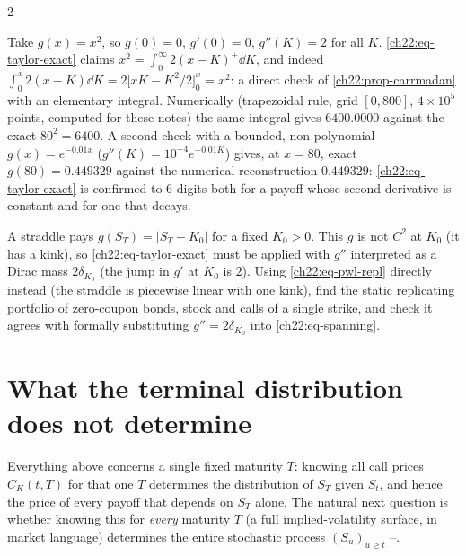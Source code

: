 \begin{paracol}{2}
\begin{example}[Checking the identity on $g(x)=x^2$]\label{ch22:ex-x2}
Take $g(x)=x^2$, so $g(0)=0$, $g'(0)=0$, $g''(K)=2$ for all $K$. \eqref{ch22:eq-taylor-exact} claims
$x^2=\int_0^\infty 2(x-K)^+\dd K$, and indeed $\int_0^x 2(x-K)\dd K=2\bigl[xK-K^2/2\bigr]_0^x=x^2$: a
direct check of \cref{ch22:prop-carrmadan} with an elementary integral. Numerically (trapezoidal rule,
grid $[0,800]$, $4\times10^5$ points, computed for these notes) the same integral gives $6400.0000$
against the exact $80^2=6400$. A second check with a bounded, non-polynomial $g(x)=e^{-0.01x}$
($g''(K)=10^{-4}e^{-0.01K}$) gives, at $x=80$, exact $g(80)=0.449329$ against the numerical
reconstruction $0.449329$: \eqref{ch22:eq-taylor-exact} is confirmed to $6$ digits both for a payoff
whose second derivative is constant and for one that decays.
\end{example}

\begin{exercise}\label{ch22:ex-straddle}
A straddle pays $g(S_T)=|S_T-K_0|$ for a fixed $K_0>0$. This $g$ is not $C^2$ at $K_0$ (it has a
kink), so \eqref{ch22:eq-taylor-exact} must be applied with $g''$ interpreted as a Dirac mass
$2\delta_{K_0}$ (the jump in $g'$ at $K_0$ is $2$). Using \eqref{ch22:eq-pwl-repl} directly instead
(the straddle is piecewise linear with one kink), find the static replicating portfolio of zero-coupon
bonds, stock and calls of a single strike, and check it agrees with formally substituting $g''=2\delta_{K_0}$
into \eqref{ch22:eq-spanning}.
\end{exercise}

\section{What the terminal distribution does not determine}\label{ch22:sec-process}

Everything above concerns a single fixed maturity $T$: knowing all call prices $C_K(t,T)$ for that one
$T$ determines the distribution of $S_T$ given $S_t$, and hence the price of every payoff that depends
on $S_T$ alone. The natural next question is whether knowing this for \emph{every} maturity $T$ (a full
implied-volatility surface, in market language) determines the entire stochastic process $(S_u)_{u\ge
t}$ --.


\end{paracol}
